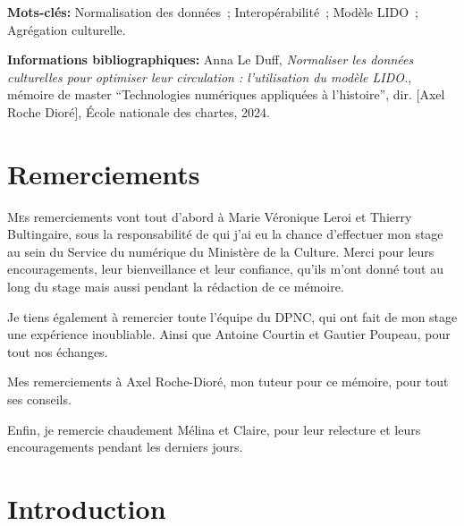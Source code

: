 \documentclass[a4paper,12pt,twoside]{book}
\begin{document}
	\textbf{Mots-clés:} Normalisation des données~; Interopérabilité~; Modèle LIDO~; Agrégation culturelle.\newline

	\textbf{Informations bibliographiques:} Anna Le Duff, \textit{Normaliser les données culturelles pour optimiser leur circulation :  l'utilisation du modèle LIDO.}, mémoire de master \enquote{Technologies numériques appliquées à l'histoire}, dir. [Axel Roche Dioré], École nationale des chartes, 2024.

		\newpage{\pagestyle{empty}\cleardoublepage}
	
	\chapter{Remerciements}
	
\lettrine{M}es remerciements vont tout d'abord à Marie Véronique Leroi et Thierry Bultingaire, sous la
responsabilité de qui j’ai eu la chance d’effectuer mon stage au sein du Service du numérique du Ministère de la Culture. Merci pour leurs encouragements, leur bienveillance et leur confiance, qu'ils m'ont donné tout au long du stage mais aussi pendant la rédaction de ce mémoire. \newline

Je tiens également à remercier toute l'équipe du DPNC, qui ont fait de mon stage une expérience inoubliable. Ainsi que Antoine Courtin et Gautier Poupeau, pour tout nos échanges.\newline

Mes remerciements à Axel Roche-Dioré, mon tuteur pour ce
mémoire, pour tout ses conseils.\newline

Enfin, je remercie chaudement Mélina et Claire, pour leur relecture et leurs encouragements pendant les derniers jours.
	\newpage{\pagestyle{empty}\cleardoublepage}
	
\printbibliography
	
\chapter{Introduction}	

\newpage{\pagestyle{empty}\cleardoublepage}

	\mainmatter
\end{document}
